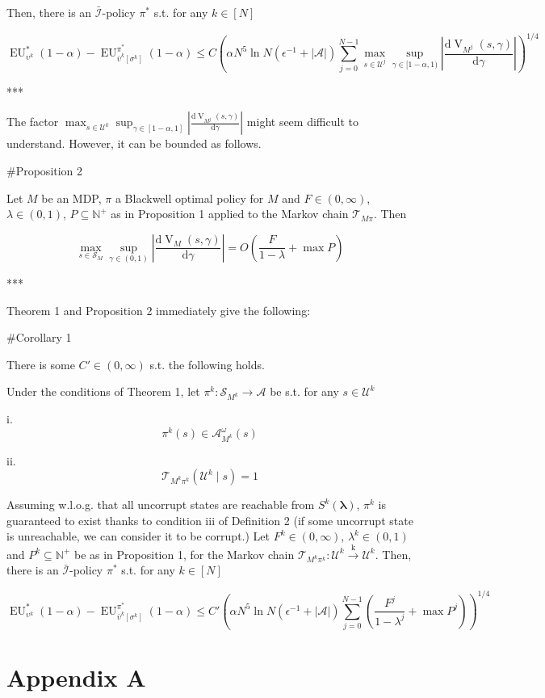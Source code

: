 \documentclass[a4paper]{article}
\newcommand{\AP}[1]{\left(#1\right)}
\newcommand{\D}{\mathrm{d}}
\newcommand{\Nats}{\mathbb{N}}
\newcommand{\Estr}{\boldsymbol{\lambda}}
\newcommand{\Abs}[1]{\left\vert #1 \right\vert}
\newcommand{\M}{\xrightarrow{\text{k}}}
\newcommand{\A}{\mathcal{A}}
\newcommand{\St}{\mathcal{S}}
\newcommand{\T}{\mathcal{T}}
\newcommand{\In}{\mathcal{I}}
\newcommand{\UC}{\mathcal{U}}
\newcommand{\V}{\operatorname{V}}
\newcommand{\EU}{\operatorname{EU}}
\newcommand{\Pd}{P}
\begin{document}
Then, there is an $\bar{\In}$-policy $\pi^*$ s.t. for any $k \in [N]$

$$\EU_{\upsilon^k}^*(1-\alpha) - \EU_{\bar{\upsilon}^k\left[\sigma^k\right]}^{\pi^*}(1-\alpha) \leq C\AP{\alpha N^5 \ln{N} \AP{\epsilon^{-1}+\Abs{\A}} \sum_{j = 0}^{N-1} \max_{s \in \UC^j} \sup_{\gamma \in [1-\alpha,1)} \Abs{\frac{\D\V_{M^j}(s,\gamma)}{\D\gamma}}}^{1/4}$$

***

The factor $\max_{s \in \UC^k} \sup_{\gamma \in [1-\alpha,1]} \Abs{\frac{\D\V_{M^j}(s,\gamma)}{\D\gamma}}$ might seem difficult to understand. However, it can be bounded as follows.

\#Proposition 2

Let $M$ be an MDP, $\pi$ a Blackwell optimal policy for $M$ and $F \in (0,\infty)$, $\lambda \in (0,1)$, $\Pd \subseteq \Nats^+$ as in Proposition 1 applied to the Markov chain $\T_{M\pi}$. Then

$$\max_{s \in \St_M} \sup_{\gamma \in (0,1)} \Abs{\frac{\D\V_M(s,\gamma)}{\D\gamma}} = O\AP{\frac{F}{1-\lambda}+\max{\Pd}}$$

***

Theorem 1 and Proposition 2 immediately give the following:

\#Corollary 1

There is some $C' \in (0,\infty)$ s.t. the following holds.

Under the conditions of Theorem 1, let $\pi^k: \St_{M^k} \rightarrow \A$ be s.t. for any $s \in \UC^k$

i. $$\pi^k(s) \in \A_{M^k}^\omega(s)$$

ii. $$\T_{M^k \pi^k}\AP{\UC^k \mid s} = 1$$ 

Assuming w.l.o.g. that all uncorrupt states are reachable from $S^k(\Estr)$, $\pi^k$ is guaranteed to exist thanks to condition iii of Definition 2 (if some uncorrupt state is unreachable, we can consider it to be corrupt.) Let $F^k\in(0,\infty)$, $\lambda^k\in(0,1)$ and $\Pd^k \subseteq \Nats^+$ be as in Proposition 1, for the Markov chain $\T_{M^k\pi^k}: \UC^k \M \UC^k$. Then, there is an $\bar{\In}$-policy $\pi^*$ s.t. for any $k \in [N]$ 

$$\EU_{\upsilon^k}^*(1-\alpha) - \EU_{\bar{\upsilon}^k\left[\sigma^k\right]}^{\pi^*}(1-\alpha) \leq C'\AP{\alpha N^5 \ln{N} \AP{\epsilon^{-1}+\Abs{\A}} \sum_{j = 0}^{N-1} \AP{\frac{F^j}{1-\lambda^j}+\max{\Pd^j}}}^{1/4}$$

\section{Appendix A}
\end{document}
